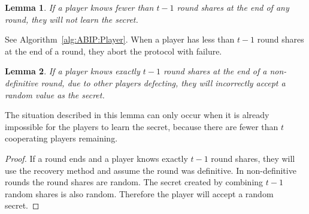 \documentclass[12pt]{dalcsthesis}
\newtheorem{lemma}{Lemma}
\begin{document}
\begin{lemma}\label{Lem:ABIP:FewSharesNolearn}If a player knows fewer than $t-1$ round shares at the end of any round, they will not learn the secret.\end{lemma}

See Algorithm~\ref{alg:ABIP:Player}. When a player has less than $t-1$ round shares at the end of a round, they abort the protocol with failure.

\begin{lemma}\label{Lem:ABIP:MissDefSharesLearnWrong}If a player knows exactly $t-1$ round shares at the end of a non-definitive round, due to other players defecting, they will incorrectly accept a random value as the secret.\end{lemma}

The situation described in this lemma can only occur when it is already impossible for the players to learn the secret, because there are fewer than $t$ cooperating players remaining.
 
\begin{proof}
If a round ends and a player knows exactly $t-1$ round shares, they will use the recovery method and assume the round was definitive. In non-definitive rounds the round shares are random. The secret created by combining $t-1$ random shares is also random. Therefore the player will accept a random secret.
\end{proof}
\end{document}
